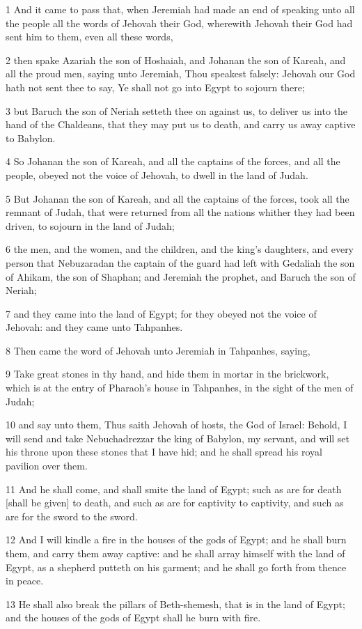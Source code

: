 \par 1 And it came to pass that, when Jeremiah had made an end of speaking unto all the people all the words of Jehovah their God, wherewith Jehovah their God had sent him to them, even all these words,
\par 2 then spake Azariah the son of Hoshaiah, and Johanan the son of Kareah, and all the proud men, saying unto Jeremiah, Thou speakest falsely: Jehovah our God hath not sent thee to say, Ye shall not go into Egypt to sojourn there;
\par 3 but Baruch the son of Neriah setteth thee on against us, to deliver us into the hand of the Chaldeans, that they may put us to death, and carry us away captive to Babylon.
\par 4 So Johanan the son of Kareah, and all the captains of the forces, and all the people, obeyed not the voice of Jehovah, to dwell in the land of Judah.
\par 5 But Johanan the son of Kareah, and all the captains of the forces, took all the remnant of Judah, that were returned from all the nations whither they had been driven, to sojourn in the land of Judah;
\par 6 the men, and the women, and the children, and the king's daughters, and every person that Nebuzaradan the captain of the guard had left with Gedaliah the son of Ahikam, the son of Shaphan; and Jeremiah the prophet, and Baruch the son of Neriah;
\par 7 and they came into the land of Egypt; for they obeyed not the voice of Jehovah: and they came unto Tahpanhes.
\par 8 Then came the word of Jehovah unto Jeremiah in Tahpanhes, saying,
\par 9 Take great stones in thy hand, and hide them in mortar in the brickwork, which is at the entry of Pharaoh's house in Tahpanhes, in the sight of the men of Judah;
\par 10 and say unto them, Thus saith Jehovah of hosts, the God of Israel: Behold, I will send and take Nebuchadrezzar the king of Babylon, my servant, and will set his throne upon these stones that I have hid; and he shall spread his royal pavilion over them.
\par 11 And he shall come, and shall smite the land of Egypt; such as are for death [shall be given] to death, and such as are for captivity to captivity, and such as are for the sword to the sword.
\par 12 And I will kindle a fire in the houses of the gods of Egypt; and he shall burn them, and carry them away captive: and he shall array himself with the land of Egypt, as a shepherd putteth on his garment; and he shall go forth from thence in peace.
\par 13 He shall also break the pillars of Beth-shemesh, that is in the land of Egypt; and the houses of the gods of Egypt shall he burn with fire.

